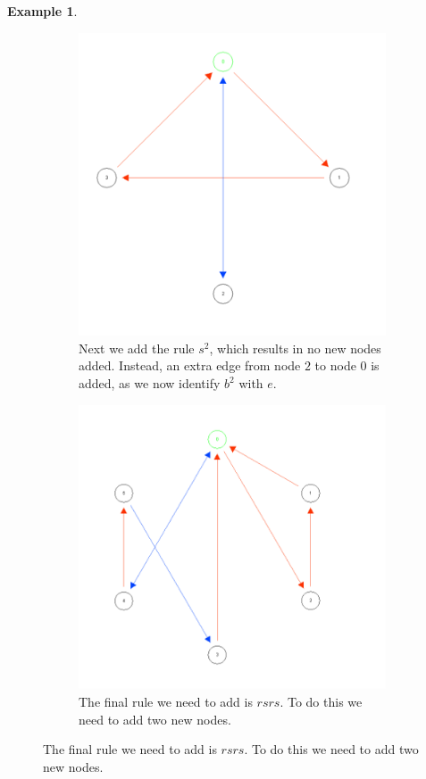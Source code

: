 \documentclass[10pt]{article}
\theoremstyle{plain}
\theoremstyle{definition}
\newtheorem{example}[theorem]{Example}
\theoremstyle{definition}
\theoremstyle{definition}
\begin{document}
\begin{multicols}{2}
\begin{example}
\begin{figure}[p]
		\begin{subfigure}{.4\textwidth}
			\centering
			\includegraphics[scale = 0.55]{TC5}
			\caption{Next we add the rule $s^2$, which results in no new nodes added. Instead, an extra edge from node $2$ to node $0$ is added, as we now identify $b^2$ with $e$.}
			\label{fig4:sub5}
		\end{subfigure}
		\begin{subfigure}{.4\textwidth}
			\centering
			\includegraphics[scale = 0.55]{TC6}
			\caption{The final rule we need to add is $rsrs$. To do this we need to add two new nodes.}
			\label{fig4:sub6}
		\end{subfigure}


\end{figure}
\end{example}
\end{multicols}
\end{document}

